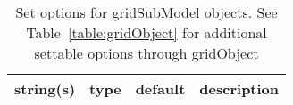 \begin{table}[ht]
\centering
\begin{tabular}{p{5cm} c c p{7cm}}
\hline
string(s) & type & default & description \\
\hline
\hline
\end{tabular}
\caption{Set options for gridSubModel objects. See Table~\ref{table:gridObject} for additional settable options through gridObject}
\label{table:gridSubModel}
\end{table}

